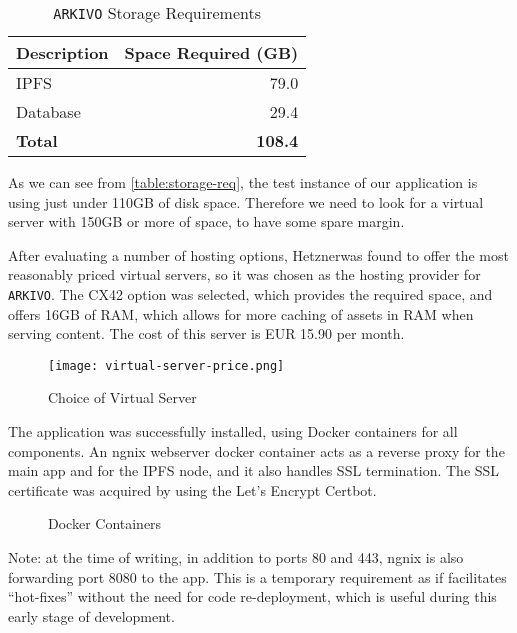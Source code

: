 \begin{table}[h]
\footnotesize
\centering
\begin{tabular}{|l|r|}
\hline
\textbf{Description} & \textbf{Space Required (GB)} \\ \hline
IPFS                 & 79.0                         \\ \hline
Database             & 29.4                         \\ \hline
\textbf{Total}       & \textbf{108.4}               \\ \hline
\end{tabular}
\caption{\texttt{ARKIVO} Storage Requirements}
\label{table:storage-req}
\end{table}


As we can see from \autoref{table:storage-req}, the test instance of our application is using just under 110GB of disk space. Therefore we need to look for a virtual server with 150GB or more of space, to have some spare margin.

After evaluating a number of hosting options, Hetzner\footnotemark[9] was found to offer the most reasonably priced virtual servers, so it was chosen as the hosting provider for \texttt{ARKIVO}.
The CX42 option was selected, which provides the required space, and offers 16GB of RAM, which allows for more caching of assets in RAM when serving content. The cost of this server is EUR 15.90 per month.


\begin{figure}[H]
    \centering
    \texttt{[image: virtual-server-price.png]}
    \caption[Choice of Virtual Server]{Choice of Virtual Server}
    \label{fig:vps-choice}
\end{figure}

The application was successfully installed, using Docker containers for all components. An ngnix webserver docker container acts as a reverse proxy for the main app and for the IPFS node, and it also handles SSL termination. The SSL certificate was acquired by using the Let's Encrypt Certbot.

\begin{figure}[h]
    \centering
    
    \caption[Docker Containers]{Docker Containers}
    \label{fig:docker-containers}
\end{figure}

Note: at the time of writing, in addition to ports 80 and 443, ngnix is also forwarding port 8080 to the app. This is a temporary requirement as if facilitates ``hot-fixes'' without the need for code re-deployment, which is useful during this early stage of development.


